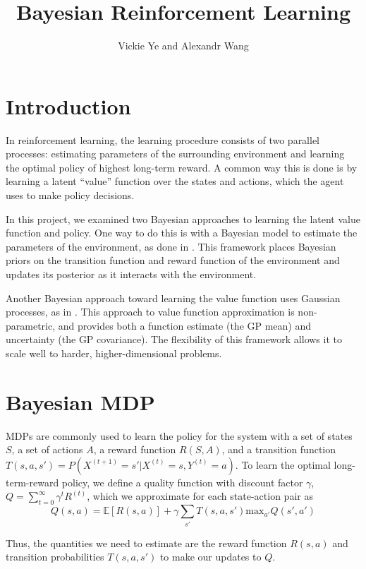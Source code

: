 \documentclass[10pt, twocolumn, twoside]{article}
\title{Bayesian Reinforcement Learning}
\date{}
\author {Vickie Ye and Alexandr Wang}
\begin{document}
\maketitle

\section{Introduction}
In reinforcement learning, the learning procedure consists of two parallel processes:
estimating parameters of the surrounding environment and learning the optimal policy
of highest long-term reward. A common way this is done is by learning a latent ``value''
function over the states and actions, which the agent uses to make policy decisions.

In this project, we examined two Bayesian approaches to learning the latent value function
and policy. One way to do this is with a Bayesian model to estimate the parameters of the
environment, as done in \cite{strens}. This framework places Bayesian priors on the
transition function and reward function of the environment and updates its posterior
as it interacts with the environment. 

Another Bayesian approach toward learning the value function uses Gaussian processes, as
in \cite{engel}. This approach to value function approximation is non-parametric, and
provides both a function estimate (the GP mean) and uncertainty (the GP covariance).
The flexibility of this framework allows it to scale well to harder, higher-dimensional
problems.

\section{Bayesian MDP}
MDPs are commonly used to learn the policy for the system with a set of states $S$,
a set of actions $A$, a reward function $R(S, A)$, and a transition function
$T(s, a, s') = P(X^{(t+1)} = s' | X^{(t)} = s, Y^{(t)} = a)$. To learn the optimal
long-term-reward policy, we define a quality function with discount factor
$\gamma$, $Q = \sum_{t=0}^\infty \gamma^t R^{(t)}$, which we approximate for each
state-action pair as
\begin{equation*}
Q(s, a) = \mathbb{E}[R(s,a)]+\gamma\sum_{s'}T(s, a, s')\textrm{max}_{a'} Q(s',a')
\end{equation*}

Thus, the quantities we need to estimate are the reward function
$R(s, a)$ and transition probabilities $T(s, a, s')$ to make our updates to $Q$.
\end{document}
